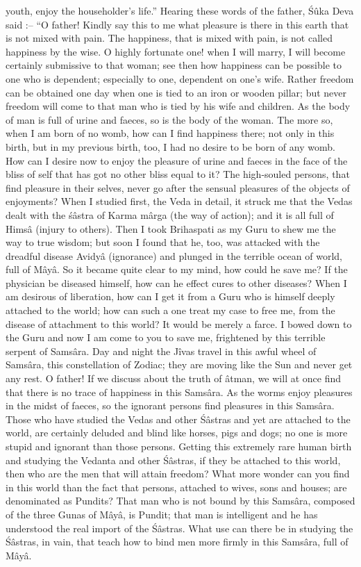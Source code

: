 youth, enjoy the householder's life.'' Hearing these words of the father, \'S\^uka Deva said :-- ``O father! Kindly say this to me what pleasure is there in this earth that is not mixed with pain. The happiness, that is mixed with pain, is not called happiness by the wise. O highly fortunate one! when I will marry, I will become certainly submissive to that woman; see then how happiness can be possible to one who is dependent; especially to one, dependent on one's wife. Rather freedom can be obtained one day when one is tied to an iron or wooden pillar; but never freedom will come to that man who is tied by his wife and children. As the body of man is full of urine and faeces, so is the body of the woman. The more so, when I am born of no womb, how can I find happiness there; not only in this birth, but in my previous birth, too, I had no desire to be born of any womb. How can I desire now to enjoy the pleasure of urine and faeces in the face of the bliss of self that has got no other bliss equal to it? The high-souled persons, that find pleasure in their selves, never go after the sensual pleasures of the objects of enjoyments? When I studied first, the Veda in detail, it struck me that the Vedas dealt with the \'s\^astra of Karma m\^arga (the way of action); and it is all full of Hims\^a (injury to others). Then I took Brihaspati as my Guru to shew me the way to true wisdom; but soon I found that he, too, was attacked with the dreadful disease Avidy\^a (ignorance) and plunged in the terrible ocean of world, full of M\^ay\^a. So it became quite clear to my mind, how could he save me? If the physician be diseased himself, how can he effect cures to other diseases? When I am desirous of liberation, how can I get it from a Guru who is himself deeply attached to the world; how can such a one treat my case to free me, from the disease of attachment to this world? It would be merely a farce. I bowed down to the Guru and now I am come to you to save me, frightened by this terrible serpent of Sams\^ara. Day and night the J\^ivas travel in this awful wheel of Sams\^ara, this constellation of Zodiac; they are moving like the Sun and never get any rest. O father! If we discuss about the truth of \^atman, we will at once find that there is no trace of happiness in this Sams\^ara. As the worms enjoy pleasures in the midst of faeces, so the ignorant persons find pleasures in this Sams\^ara. Those who have studied the Vedas and other \'S\^astras and yet are attached to the world, are certainly deluded and blind like horses, pigs and dogs; no one is more stupid and ignorant than those persons. Getting this extremely rare human birth and studying the Vedanta and other \'S\^astras, if they be attached to this world, then who are the men that will attain freedom? What more wonder can you find in this world than the fact that persons, attached to wives, sons and houses; are denominated as Pundits? That man who is not bound by this Sams\^ara, composed of the three Gunas of M\^ay\^a, is Pundit; that man is intelligent and he has understood the real import of the \'S\^astras. What use can there be in studying the \'S\^astras, in vain, that teach how to bind men more firmly in this Sams\^ara, full of M\^ay\^a.

